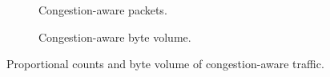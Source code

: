 \begin{figure}
	\centering
	\begin{subfigure}{\linewidth}
		\centering
		\caption{Congestion-aware packets.}
	\end{subfigure}
	\begin{subfigure}{\linewidth}
		\centering
		\caption{Congestion-aware byte volume.}
	\end{subfigure}
	\caption{Proportional counts and byte volume of congestion-aware traffic.\label{fig:caida-ca}}
\end{figure}

